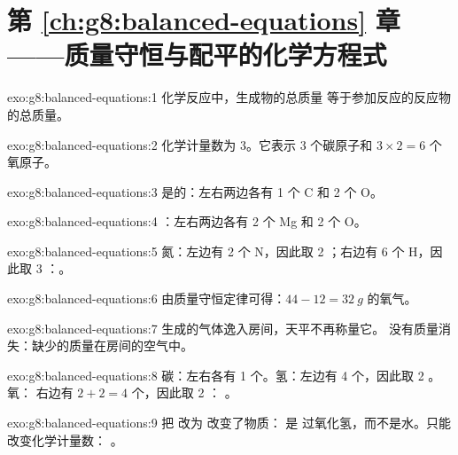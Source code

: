 \section*{第 \ref{ch:g8:balanced-equations} 章——质量守恒与配平的化学方程式}

\begin{solution}{exo:g8:balanced-equations:1}
化学反应中，生成物的总质量
等于参加反应的反应物的总质量。
\end{solution}

\begin{solution}{exo:g8:balanced-equations:2}
化学计量数为 3。它表示 3 个碳原子和 $3 \times 2 = 6$
个氧原子。
\end{solution}

\begin{solution}{exo:g8:balanced-equations:3}
是的：左右两边各有 1 个 C 和 2 个 O。
\end{solution}

\begin{solution}{exo:g8:balanced-equations:4}
：左右两边各有 2 个 Mg 和 2 个 O。
\end{solution}

\begin{solution}{exo:g8:balanced-equations:5}
氮：左边有 2 个 N，因此取 2 ；右边有 6 个 H，因此取 3
：。
\end{solution}

\begin{solution}{exo:g8:balanced-equations:6}
由质量守恒定律可得：$44 - 12 = \qty{32}{g}$ 的氧气。
\end{solution}

\begin{solution}{exo:g8:balanced-equations:7}
生成的气体逸入房间，天平不再称量它。
没有质量消失：缺少的质量在房间的空气中。
\end{solution}

\begin{solution}{exo:g8:balanced-equations:8}
碳：左右各有 1 个。氢：左边有 4 个，因此取 2 。氧：
右边有 $2 + 2 = 4$ 个，因此取 2 ：
。
\end{solution}

\begin{solution}{exo:g8:balanced-equations:9}
把  改为  改变了物质： 是
过氧化氢，而不是水。只能改变化学计量数：
。
\end{solution}

